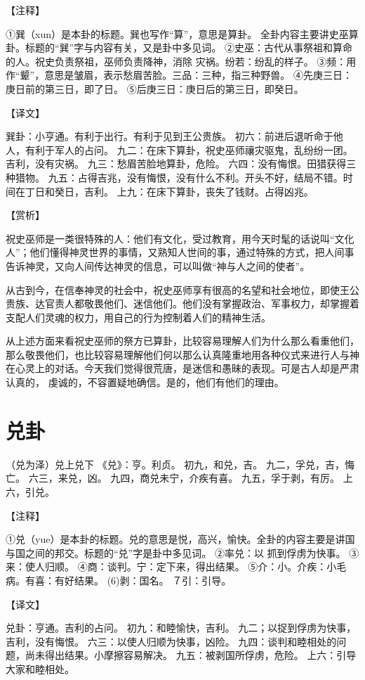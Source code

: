 \documentclass[a4paper,12pt,UTF8,twoside]{ctexbook}
\begin{document}
【注释】

①巽（xun）是本卦的标题。巽也写作“算”，意思是算卦。 全卦内容主要讲史巫算卦。标题的“巽”字与内容有关，又是卦中多见词。
②史巫：古代从事祭祖和算命的人。祝史负责祭祖，巫师负责降神，消除 灾祸。纷若：纷乱的样子。
③频：用作“颦”，意思是皱眉，表示愁眉苦脸。三品：三种，指三种野兽。
④先庚三日：庚日前的第三日，即了日。
⑤后庚三日：庚日后的第三日，即癸日。

【译文】

巽卦：小亨通。有利于出行。有利于见到王公贵族。
初六：前进后退听命于他人，有利于军人的占问。
九二：在床下算卦，祝史巫师禳灾驱鬼，乱纷纷一团。吉利，没有灾祸。
九三：愁眉苦脸地算卦，危险。
六四：没有悔恨。田猎获得三种猎物。
九五：占得吉兆，没有悔恨，没有什么不利。开头不好，结局不错。时间在丁日和癸日，吉利。
上九：在床下算卦，丧失了钱财。占得凶兆。

【赏析】

祝史巫师是一类很特殊的人：他们有文化，受过教育，用今天时髦的话说叫“文化人”；他们懂得神灵世界的事情，又熟知人世间的事，通过特殊的方式，把人间事告诉神灵，又向人间传达神灵的信息，可以叫做“神与人之间的使者”。

从古到今，在信奉神灵的社会中，祝史巫师享有很高的名望和社会地位，即使王公贵族、达官责人都敬畏他们、迷信他们。他们没有掌握政治、军事权力，却掌握着支配人们灵魂的权力，用自己的行为控制着人们的精神生活。

从上述方面来看祝史巫师的祭方已算卦，比较容易理解人们为什么那么看重他们，那么敬畏他们，也比较容易理解他们何以那么认真隆重地用各种仪式来进行人与神在心灵上的对话。今天我们觉得很荒唐，是迷信和愚昧的表现。可是古人却是严肃认真的， 虔诚的，不容置疑地确信。是的，他们有他们的理由。

\chapter{兑卦}

（兑为泽）兑上兑下
《兑》：亨。利贞。
初九，和兑，吉。
九二，孚兑，吉，悔亡。
六三，来兑，凶。
九四，商兑未宁，介疾有喜。
九五，孚于剥，有厉。
上六，引兑。

【注释】

①兑（yue）是本卦的标题。兑的意思是悦，高兴，愉快。全卦的内容主要是讲国与国之间的邦交。标题的“兑”字是卦中多见词。
②率兑：以 抓到俘虏为快事。
③来：使人归顺。
④商：谈判。宁：定下来，得出结果。
⑤介：小。介疾：小毛病。有喜：有好结果。
(6)剥：国名。
７引：引导。

【译文】

兑卦：亨通。吉利的占问。
初九：和睦愉快，吉利。
九二；以捉到俘虏为快事，吉利，没有悔恨。
六三：以使人归顺为快事，凶险。
九四：谈判和睦相处的问题，尚未得出结果。小摩擦容易解决。
九五：被剥国所俘虏，危险。
上六：引导大家和睦相处。
\end{document}
